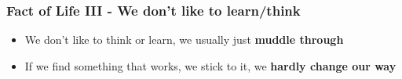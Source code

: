 \documentclass{beamer}
\begin{document}
\begin{frame}
	\frametitle{Fact of Life III - We don't like to learn/think}
	\begin{itemize}
		\item We don't like to think or learn, we usually just \textbf{muddle through} 
		\item If we find something that works, we stick to it, we \textbf{hardly change our way}
	\end{itemize}
\end{frame}
\end{document}
